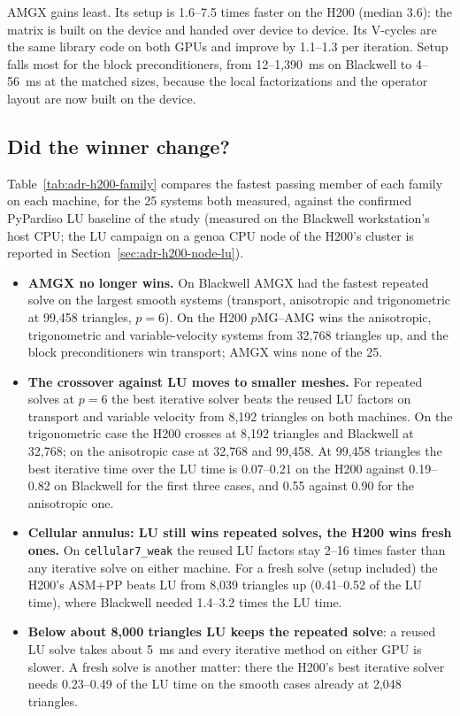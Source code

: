 AMGX gains least. Its setup is 1.6--7.5 times faster on the H200 (median 3.6): the matrix is
built on the device and handed over device to device. Its V-cycles are the same library code on
both GPUs and improve by 1.1--1.3 per iteration. Setup falls most for the block preconditioners,
from 12--1{,}390~ms on Blackwell to 4--56~ms at the matched sizes, because the local
factorizations and the operator layout are now built on the device.

\subsection{Did the winner change?}

Table~\ref{tab:adr-h200-family} compares the fastest passing member of each family on each
machine, for the 25 systems both measured, against the confirmed PyPardiso LU baseline of the
study (measured on the Blackwell workstation's host CPU; the LU campaign on a genoa CPU node of
the H200's cluster is reported in Section~\ref{sec:adr-h200-node-lu}).
\begin{itemize}
\item \textbf{AMGX no longer wins.} On Blackwell AMGX had the fastest repeated solve on the
  largest smooth systems (transport, anisotropic and trigonometric at 99{,}458 triangles,
  $p=6$). On the H200 $p$MG--AMG wins the anisotropic, trigonometric and variable-velocity
  systems from 32{,}768 triangles up, and the block preconditioners win transport; AMGX wins
  none of the 25.
\item \textbf{The crossover against LU moves to smaller meshes.} For repeated solves at $p=6$
  the best iterative solver beats the reused LU factors on transport and variable velocity from
  8{,}192 triangles on both machines. On the trigonometric case the H200 crosses at 8{,}192
  triangles and Blackwell at 32{,}768; on the anisotropic case at 32{,}768 and 99{,}458. At
  99{,}458 triangles the best iterative time over the LU time is 0.07--0.21 on the H200 against
  0.19--0.82 on Blackwell for the first three cases, and 0.55 against 0.90 for the anisotropic
  one.
\item \textbf{Cellular annulus: LU still wins repeated solves, the H200 wins fresh ones.} On
  \texttt{cellular7\_weak} the reused LU factors stay 2--16 times faster than any iterative
  solve on either machine. For a fresh solve (setup included) the H200's ASM+PP beats LU from
  8{,}039 triangles up (0.41--0.52 of the LU time), where Blackwell needed 1.4--3.2 times the
  LU time.
\item \textbf{Below about 8{,}000 triangles LU keeps the repeated solve}: a reused LU solve
  takes about 5~ms and every iterative method on either GPU is slower. A fresh solve is another
  matter: there the H200's best iterative solver needs 0.23--0.49 of the LU time on the smooth
  cases already at 2{,}048 triangles.
\end{itemize}


